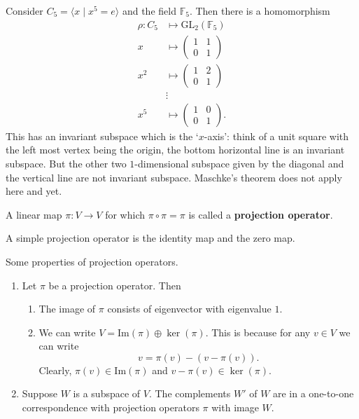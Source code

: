 \documentclass[12pt, a4paper]{article}
\newcommand{\gl}{\text{GL}}
\begin{document}
\begin{mdexample}
    Consider \(C_5 =\langle x \mid x^5=e\rangle\) and the field \(\mathbb{F}_5\). Then there is a homomorphism 
    \[\begin{aligned}
        \rho : C_5 &\mapsto \gl_2(\mathbb{F}_5) \\
        x &\mapsto \begin{pmatrix} 1 & 1 \\ 0 &1 \end{pmatrix} \\
        x^2 &\mapsto \begin{pmatrix} 1 & 2 \\ 0 &1 \end{pmatrix} \\
        &\vdots \\
        x^5 &\mapsto \begin{pmatrix} 1 & 0 \\ 0 &1 \end{pmatrix}.
    \end{aligned}\]
    This has an invariant subspace which is the `\(x\)-axis': think of a unit square with the left most vertex being the origin, the bottom horizontal line is an invariant subspace. But the other two \(1\)-dimensional subspace given by the diagonal and the vertical line are not invariant subspace. Maschke's theorem does not apply here and yet.
\end{mdexample}

\begin{definition}
    A linear map \(\pi:V \to V\) for which \(\pi \circ \pi =\pi\) is called a \textbf{projection operator}.
\end{definition}

\begin{example}
    A simple projection operator is the identity map and the zero map.
\end{example}

\begin{proposition}
    Some properties of projection operators.
    \begin{enumerate}
        \item Let \(\pi\) be a projection operator. Then 
            \begin{enumerate}
                \item The image of \(\pi\) consists of eigenvector with eigenvalue \(1\).
                \item We can write \(V = \text{Im}(\pi)\oplus \ker(\pi)\). This is because for any \(v\in V\) we can write 
                \[v= \pi(v)-(v-\pi(v)).\]
                Clearly, \(\pi(v) \in \text{Im}(\pi)\) and \(v-\pi(v)\in \ker(\pi)\).
            \end{enumerate}
        \item Suppose \(W\) is a subspace of \(V\). The complements \(W'\) of \(W\) are in a one-to-one correspondence with projection operators \(\pi\) with image \(W\). 
    \end{enumerate}
\end{proposition}
\end{document}
